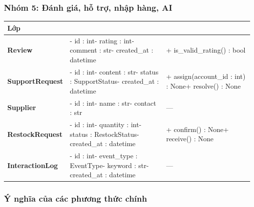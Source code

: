 \documentclass[12pt,a4paper,oneside]{report}
\begin{document}
\subsubsection*{Nhóm 5: Đánh giá, hỗ trợ, nhập hàng, AI}

\begin{longtable}{>{\raggedright\arraybackslash\small\bfseries}p{3.5cm}>{\raggedright\arraybackslash\ttfamily\footnotesize}p{5.1cm}>{\raggedright\arraybackslash\ttfamily\footnotesize}p{6.7cm}}
\toprule
\textbf{Lớp} & \multicolumn{1}{l}{\textbf{Thuộc tính}} & \multicolumn{1}{l}{\textbf{Phương thức}} \\
\midrule
\endhead
\bottomrule
\endlastfoot
Review & - id : int\newline - rating : int\newline - comment : str\newline - created\_at : datetime & + is\_valid\_rating() : bool \\
\midrule
SupportRequest & - id : int\newline - content : str\newline - status : SupportStatus\newline - created\_at : datetime & + assign(account\_id : int) : None\newline + resolve() : None \\
\midrule
Supplier & - id : int\newline - name : str\newline - contact : str & --- \\
\midrule
RestockRequest & - id : int\newline - quantity : int\newline - status : RestockStatus\newline - created\_at : datetime & + confirm() : None\newline + receive() : None \\
\midrule
InteractionLog & - id : int\newline - event\_type : EventType\newline - keyword : str\newline - created\_at : datetime & --- \\
\midrule
\end{longtable}

\subsubsection*{Ý nghĩa của các phương thức chính}
\end{document}
